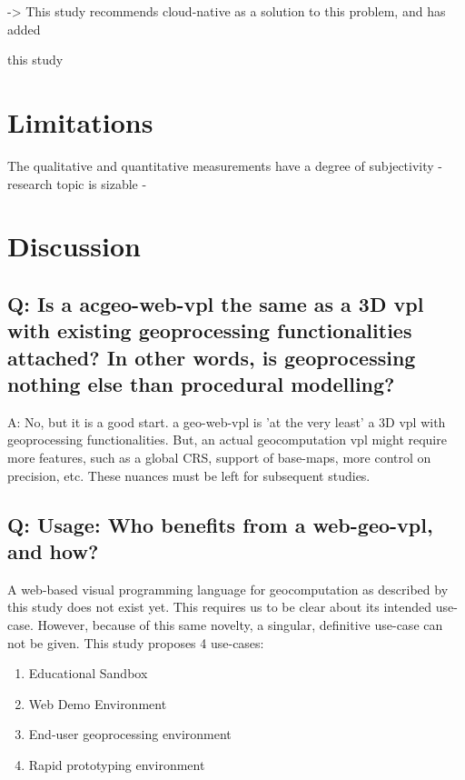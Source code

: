-> This study recommends cloud-native as a solution to this problem, and has added 


this study 


\section{Limitations}

The qualitative and quantitative measurements have a degree of subjectivity
- research topic is sizable
- 





\section{Discussion}
\label{sec:discussion}


\subsection{Q: Is a ac{geo-web-vpl} the same as a 3D vpl with existing geoprocessing functionalities attached? In other words, is geoprocessing nothing else than procedural modelling?}

A: No, but it is a good start. a geo-web-vpl is 'at the very least' a 3D vpl with geoprocessing functionalities. 
But, an actual geocomputation vpl might require more features, such as a global CRS, support of base-maps, more control on precision, etc. 
These nuances must be left for subsequent studies. 

\subsection{Q: Usage: Who benefits from a web-geo-vpl, and how? }
A web-based visual programming language for geocomputation as described by this study does not exist yet. 
This requires us to be clear about its intended use-case. 
However, because of this same novelty, a singular, definitive use-case can not be given.
This study proposes 4 use-cases:
\begin{enumerate}[-]
  \item Educational Sandbox
  \item Web Demo Environment
  \item End-user geoprocessing environment 
  \item Rapid prototyping environment
\end{enumerate}

